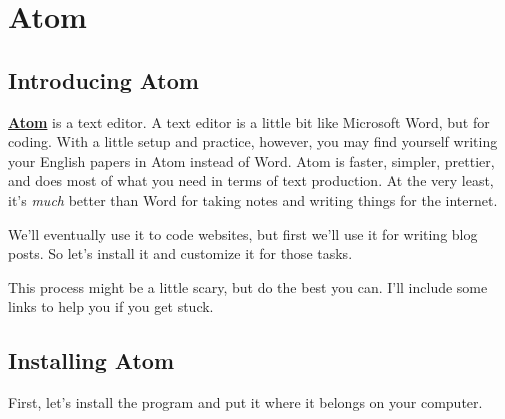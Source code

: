 \documentclass[]{book}
\theoremstyle{definition}
\theoremstyle{definition}
\theoremstyle{definition}
\theoremstyle{remark}
\begin{document}
\hypertarget{atom}{%
\chapter{Atom}\label{atom}}

\hypertarget{introducing-atom}{%
\section{Introducing Atom}\label{introducing-atom}}

\textbf{\href{https://atom.io/}{Atom}} is a text editor. A text editor
is a little bit like Microsoft Word, but for coding. With a little setup
and practice, however, you may find yourself writing your English papers
in Atom instead of Word. Atom is faster, simpler, prettier, and does
most of what you need in terms of text production. At the very least,
it's \emph{much} better than Word for taking notes and writing things
for the internet.

We'll eventually use it to code websites, but first we'll use it for
writing blog posts. So let's install it and customize it for those
tasks.

This process might be a little scary, but do the best you can. I'll
include some links to help you if you get stuck.

\hypertarget{installing-atom}{%
\section{Installing Atom}\label{installing-atom}}

First, let's install the program and put it where it belongs on your
computer.
\end{document}
